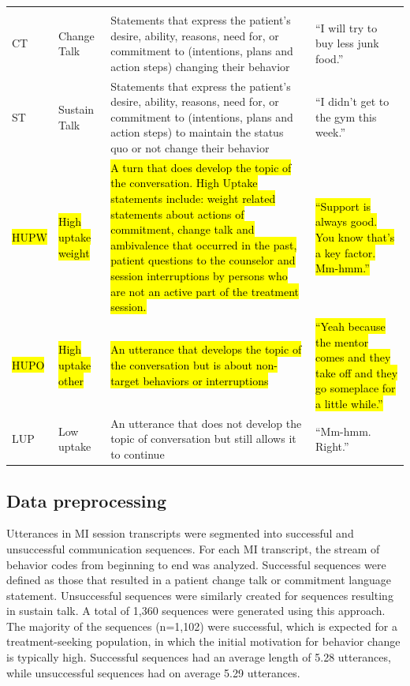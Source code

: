 \begin{small}
\begin{longtable}{p{1.3cm}p{2cm}p{5cm}p{4.8cm}}
\rowcolor{lightgraycol}
\noalign{\smallskip}
\multicolumn{4}{l}{\textbf{Patient}} \\
\noalign{\smallskip}
CT & Change Talk & Statements that express the patient's desire, ability, reasons, need for, or commitment to (intentions, plans and action steps) changing their behavior & ``I will try to buy less junk food.''\\
ST & Sustain Talk & Statements that express the patient's desire, ability, reasons, need for, or commitment to (intentions, plans and action steps) to maintain the status quo or not change their behavior  & ``I didn't get to the gym this week.''\\
\hl{HUPW} & \hl{High uptake weight} & \hl{A turn that does develop the topic of the conversation. High Uptake statements include: weight related statements about actions of commitment, change talk and ambivalence that occurred in the past, patient questions to the counselor and session interruptions by persons who are not an active part of the treatment session.} & \hl{``Support is always good.  You know that's a key factor.  Mm-hmm.''}\\
\hl{HUPO} & \hl{High uptake other} & \hl{An utterance that develops the topic of the conversation but is about non-target behaviors or interruptions} & \hl{``Yeah because the mentor comes and they take off and they go someplace for a little while.''}\\
LUP & Low uptake  & An utterance that does not develop the topic of conversation but still allows it to continue & ``Mm-hmm.  Right.''\\
\hline
\end{longtable}
\end{small}

\subsection{Data preprocessing}
\label{subsec:datapreprocessing}
Utterances in MI session transcripts were segmented into successful and unsuccessful communication sequences. For each MI transcript, the stream of behavior codes from beginning to end was analyzed. Successful sequences were defined as those that resulted in a patient change talk or commitment language statement. Unsuccessful sequences were similarly created for sequences resulting in sustain talk. A total of 1,360 sequences were generated using this approach. The majority of the sequences (n=1,102) were successful, which is expected for a treatment-seeking population, in which the initial motivation for behavior change is typically high. Successful sequences had an average length of 5.28 utterances, while unsuccessful sequences had on average 5.29 utterances.  

